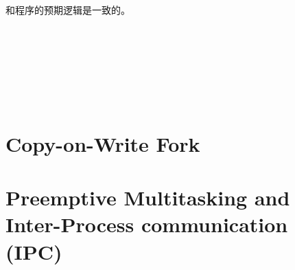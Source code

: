 \documentclass{article}
\begin{document}
\begin{CJK*}{UTF8}{gkai}
和程序的预期逻辑是一致的。


\begin{lstlisting}[style=console]
\end{lstlisting}

\begin{lstlisting}[style=console]
\end{lstlisting}





\begin{lstlisting}[style=exercise]
\end{lstlisting}

\begin{lstlisting}[style=exercise]
\end{lstlisting}

\begin{lstlisting}[style=exercise]
\end{lstlisting}


\begin{lstlisting}[style=exercise]
\end{lstlisting}



\begin{lstlisting}[style=ccode, title={\scriptsize \ttfamily \bfseries kern/}]
\end{lstlisting}


\begin{lstlisting}[style=ccode, title={\scriptsize \ttfamily \bfseries kern/}]
\end{lstlisting}


\begin{lstlisting}[style=ccode, title={\scriptsize \ttfamily \bfseries kern/}]
\end{lstlisting}



\section{Copy-on-Write Fork}

\section{Preemptive Multitasking and Inter-Process communication (IPC)}




\begin{lstlisting}[style=console]
\end{lstlisting}


\end{CJK*}
\end{document}
